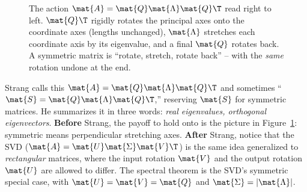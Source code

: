 \begin{figure}[H]
\centering
{}
\caption{The action $\mat{A}=\mat{Q}\mat{\Lambda}\mat{Q}\T$ read right to left.
$\mat{Q}\T$ rigidly rotates the principal axes onto the coordinate axes (lengths
unchanged), $\mat{\Lambda}$ stretches each coordinate axis by its eigenvalue, and a
final $\mat{Q}$ rotates back. A symmetric matrix is ``rotate, stretch, rotate
back'' -- with the \emph{same} rotation undone at the end.}
\label{ch26:fig-rotate-stretch}
\end{figure}

\begin{strangbox}
Strang calls this $\mat{A} = \mat{Q}\mat{\Lambda}\mat{Q}\T$ and sometimes
``$\mat{S} = \mat{Q}\mat{\Lambda}\mat{Q}\T$,'' reserving $\mat{S}$ for symmetric
matrices. He summarizes it in three words: \emph{real eigenvalues, orthogonal
eigenvectors}. \textbf{Before} Strang, the payoff to hold onto is the picture in
Figure~\ref{ch26:fig-rotate-stretch}: symmetric means perpendicular stretching
axes. \textbf{After} Strang, notice that the SVD ($\mat{A}=\mat{U}\mat{\Sigma}\mat{V}\T$)
is the same idea generalized to \emph{rectangular} matrices, where the input
rotation $\mat{V}$ and the output rotation $\mat{U}$ are allowed to differ. The
spectral theorem is the SVD's symmetric special case, with $\mat{U}=\mat{V}=\mat{Q}$
and $\mat{\Sigma}=|\mat{\Lambda}|$.
\end{strangbox}

